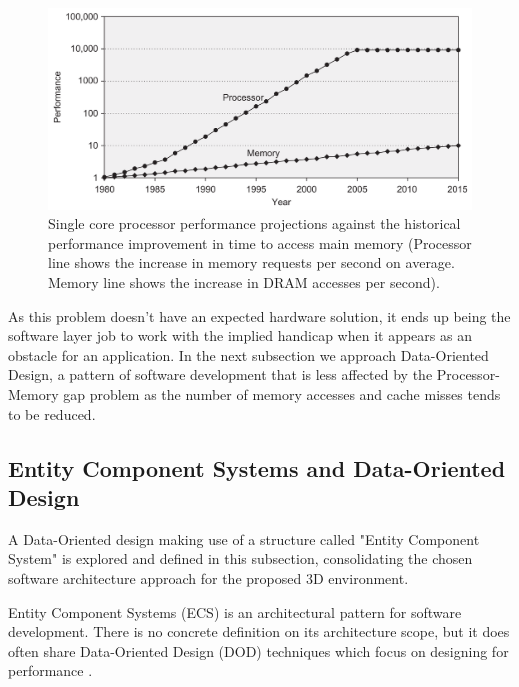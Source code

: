     \begin{figure}[H]
        \caption{
        \label{fig:performance-gap-processor-memory}
            Single core processor performance projections against the historical performance improvement in time to access main memory (Processor line shows the increase in memory requests per second on average. Memory line shows the increase in DRAM accesses per second).
        }
        \begin{center}
        \includegraphics[width=1\textwidth]{images/performance-gap-processor-memory.png}
        \end{center}
    \end{figure}

    As this problem doesn't have an expected hardware solution, it ends up being the software layer job to work with the implied handicap when it appears as an obstacle for an application. In the next subsection we approach Data-Oriented Design, a pattern of software development that is less affected by the Processor-Memory gap problem as the number of memory accesses and cache misses tends to be reduced.
    
\subsection{Entity Component Systems and Data-Oriented Design}

    A Data-Oriented design making use of a structure called "Entity Component System" is explored and defined in this subsection, consolidating the chosen software architecture approach for the proposed 3D environment.

    Entity Component Systems (ECS) is an architectural pattern for software development. There is no concrete definition on its architecture scope, but it does often share Data-Oriented Design (DOD) techniques which focus on designing for performance \cite{llopis-game-engine-gems-2}.
    
